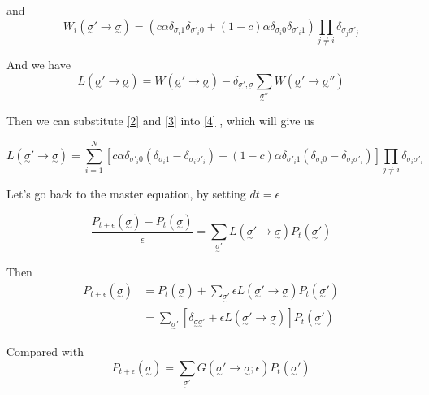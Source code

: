 \documentclass[letterpaper,12pt]{article}
\begin{document}
and 
\[
W_i(\underset{\sim}{\sigma}' \rightarrow \underset{\sim}{\sigma})=\left( c\alpha\delta_{\sigma_i 1}  \delta_{\sigma'_i 0} +(1-c)\alpha \delta_{\sigma_i 0}  \delta_{\sigma'_i 1} \right) \underset{j\neq i}{\prod} \delta_{\sigma_j \sigma'_j} \label {3}\tag{3}
\]

And we have
 \[
 L(\underset{\sim}{\sigma}'\rightarrow\underset{\sim}{\sigma})=W( \underset{\sim}{\sigma}' \rightarrow \underset{\sim}{\sigma})-\delta_{\underset{\sim}{\sigma}',\underset{\sim}{\sigma}}\underset{\underset{\sim}{\sigma}''}{\sum}W(\underset{\sim}{\sigma}'\rightarrow\underset{\sim}{\sigma}'')\label {4}\tag{4}
 \]
 
 Then we can substitute \eqref{2} and \eqref{3} into \eqref{4} , which will give us
 
 \[
 L(\underset{\sim}{\sigma}'\rightarrow\underset{\sim}{\sigma})=\sum\limits_{i=1}^N \left[ c\alpha \delta_{\sigma'_i 0} (\delta_{\sigma_i 1}-\delta_{\sigma_i \sigma'_i })+(1-c)\alpha \delta_{\sigma'_i 1}(\delta_{\sigma_i 0}-\delta_{\sigma_i \sigma'_i}) \right]  \underset{j \neq i}{\prod}\delta_{\sigma_i \sigma'_i}
 \label{5} \tag{5}
 \]

Let's go back to the master equation, by setting $dt=\epsilon$

\[
\frac{P_{t+\epsilon}(\underset{\sim}{\sigma})-P_t(\underset{\sim}{\sigma})}{\epsilon}=\underset{\underset{\sim}{\sigma}'}{\sum} L(\underset{\sim}{\sigma}'\rightarrow\underset{\sim}{\sigma})P_t(\underset{\sim}{\sigma}')
\]

Then
\[
\left.
\begin{aligned}
P_{t+\epsilon}(\underset{\sim}{\sigma})&=P_t(\underset{\sim}{\sigma})+\underset{\underset{\sim}{\sigma}'}{\sum}\epsilon L(\underset{\sim}{\sigma}'\rightarrow\underset{\sim}{\sigma})P_t(\underset{\sim}{\sigma}')\\
&=\underset{\underset{\sim}{\sigma}'}{\sum} \left[  \delta_{\underset{\sim}{\sigma} \underset{\sim}{\sigma}'}+\epsilon L(\underset{\sim}{\sigma}'\rightarrow\underset{\sim}{\sigma}) \right] P_t(\underset{\sim}{\sigma}')
\end{aligned}
\right.
\] 
 
Compared with 
\[
P_{t+\epsilon}(\underset{\sim}{\sigma})=\underset{\underset{\sim}{\sigma}'}{\sum} G(\underset{\sim}{\sigma}' \rightarrow \underset{\sim}{\sigma} ; \epsilon)P_t(\underset{\sim}{\sigma}')
\]
\end{document}
